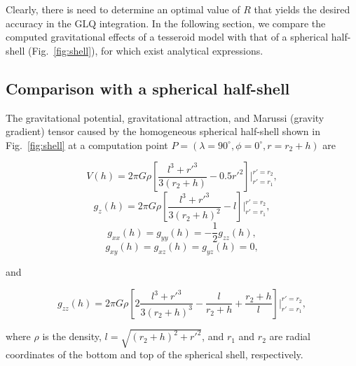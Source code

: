 \documentclass[extra]{gji}
\begin{document}
Clearly,
there is need to determine
an optimal value of $R$
that yields the desired accuracy
in the GLQ integration.
In the following section,
we compare the computed gravitational effects
of a tesseroid model
with that of a spherical half-shell
(Fig.~\ref{fig:shell}),
for which exist analytical expressions.


\subsection{Comparison with a spherical half-shell}

The gravitational potential,
gravitational attraction,
and
Marussi (gravity gradient) tensor
caused by the homogeneous spherical half-shell
shown in Fig.~\ref{fig:shell}
at a computation point
$P = (\lambda=90^\circ, \phi=0^\circ, r=r_2+h)$
are

\begin{equation}
    V(h) = 2\pi G \rho \left[
        \frac{l^3 + {r'}^3}{3(r_2 + h)} - 0.5 {r'}^2 \right]
         \Biggr|_{r'=r_1}^{r'=r_2},
    \label{eq:shellpot}
\end{equation}
\begin{equation}
    g_z(h) = 2\pi G \rho \left[
        \frac{l^3 + {r'}^3}{3(r_2 + h)^2} - l \right]
        \Biggr|_{r'=r_1}^{r'=r_2},
    \label{eq:shellgz}
\end{equation}
\begin{equation}
    g_{xx}(h) = g_{yy}(h) = -\frac{1}{2} g_{zz}(h),
\end{equation}
\begin{equation}
    g_{xy}(h) = g_{xz}(h) = g_{yz}(h) = 0,
\end{equation}

\noindent
and

\begin{equation}
    g_{zz}(h) = 2\pi G \rho \left[
        2\frac{l^3 + {r'}^3}{3(r_2 + h)^3}
        - \frac{l}{r_2 + h} + \frac{r_2 + h}{l}
        \right]
        \Biggr|_{r'=r_1}^{r'=r_2},
    \label{eq:shellgzz}
\end{equation}

\noindent
where $\rho$ is the density,
$l = \sqrt{(r_2 + h)^2 + {r'}^2}$,
and
$r_1$ and $r_2$ are radial coordinates of
the bottom and top of the spherical shell,
respectively.
\end{document}
